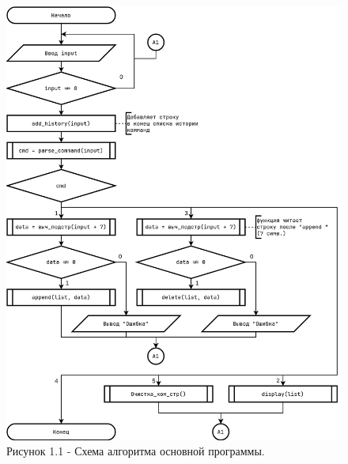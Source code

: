 \documentclass[oneside,a4paper,14pt]{extarticle}
\begin{document}
\clearpage
\begin{figure}[H]
	\centering
	\includegraphics[height=0.9\textheight]{pics/flowchart1.png}
	\caption*{Рисунок 1.1 - Схема алгоритма основной программы.}
\end{figure}
\end{document}
